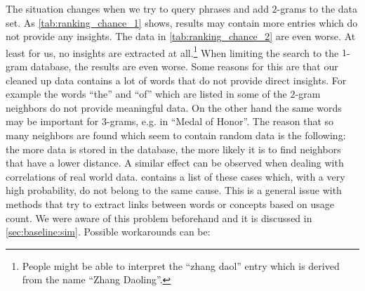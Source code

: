 The situation changes when we try to query phrases and add $2$-grams to the data set. As \autoref{tab:ranking_chance_1} shows, results may contain more entries which do not provide any insights. The data in \autoref{tab:ranking_chance_2} are even worse. At least for us, no insights are extracted at all.\footnote{People might be able to interpret the \enquote{zhang daol} entry which is derived from the name \enquote{Zhang Daoling}.} When limiting the search to the $1$-gram database, the results are even worse. Some reasons for this are that our cleaned up data contains a lot of words that do not provide direct insights. For example the words \enquote{the} and \enquote{of} which are listed in some of the $2$-gram neighbors do not provide meaningful data. On the other hand the same words may be important for $3$-grams, e.g. in \enquote{Medal of Honor}. The reason that so many neighbors are found which seem to contain random data is the following: the more data is stored in the database, the more likely it is to find neighbors that have a lower distance. A similar effect can be observed when dealing with correlations of real world data. \cite{correlations1} contains a list of these cases which, with a very high probability, do not belong to the same cause. This is a general issue with methods that try to extract links between words or concepts based on usage count. We were aware of this problem beforehand and it is discussed in \autoref{sec:baseline:sim}. Possible workarounds can be:

